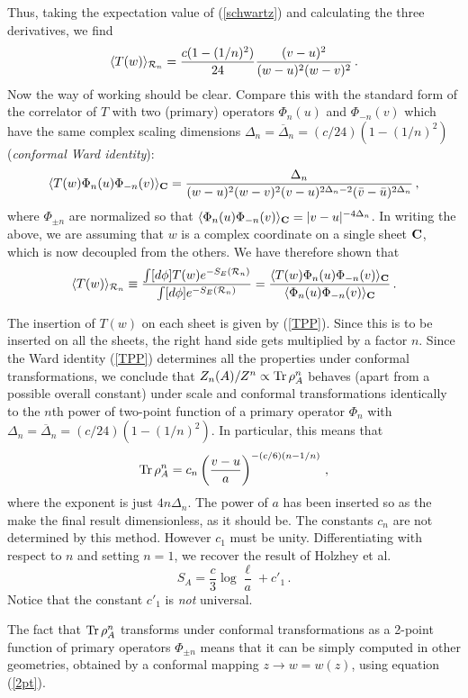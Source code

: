 \documentclass{ws-ijqi}
\def\be{\begin{equation}}
\def\ee{\end{equation}}
\begin{document}
Thus, taking the expectation value of (\ref{schwartz}) and calculating the 
three derivatives, we find
\be
\langle T(w)\rangle_{{\cal R}_n}=
{c(1-(1/n)^2)\over 24}{(v-u)^2\over(w-u)^2(w-v)^2}\,.
\ee
Now the way of working should be clear.
Compare this with the standard form of the correlator of
$T$ with two (primary) operators $\Phi_n(u)$ and $\Phi_{-n}(v)$ which have
the same complex scaling dimensions 
$\Delta_n=\overline\Delta_n=(c/24)(1-(1/n)^2)$ ({\it conformal
Ward identity}):\cite{confbook}
\be
\label{TPP}
\langle T(w)\Phi_n(u)\Phi_{-n}(v)\rangle_{\bf C}=
{\Delta_n\over (w-u)^2(w-v)^2(v-u)^{2\Delta_n-2}
(\bar v-\bar u)^{2\Delta_n}}\,,
\ee
where $\Phi_{\pm n}$ are normalized so that
$\langle \Phi_n(u)\Phi_{-n}(v)\rangle_{\bf C}=|v-u|^{-4\Delta_n}$. 
In writing the above, we are assuming that $w$ is a complex coordinate
on a single sheet $\bf C$, which is now decoupled from the others.   
We have therefore shown that 
\begin{equation}
\langle T(w)\rangle_{{\cal R}_n}\equiv
{\int[d\phi]T(w)e^{-S_E({\cal R}_n)}\over
\int[d\phi]e^{-S_E({\cal R}_n)}}=
{\langle T(w)\Phi_n(u)\Phi_{-n}(v)\rangle_{\bf C}
\over \langle \Phi_n(u)\Phi_{-n}(v)\rangle_{\bf C}}\,.
\end{equation}

The insertion of $T(w)$ on each sheet is given by (\ref{TPP}).
Since this is to be inserted on all the sheets, the right hand side 
gets multiplied by 
a factor $n$.
Since the Ward identity (\ref{TPP}) determines all the properties under 
conformal transformations, we conclude that 
$Z_n({A})/Z^n\propto{\rm Tr}\,\rho_{A}^n$ behaves 
(apart from a possible overall constant)
under scale and conformal transformations identically to the $n$th power
of two-point function of a primary operator $\Phi_n$ with 
$\Delta_n=\overline\Delta_n=(c/24)(1-(1/n)^2)$. 
In particular, this means that
\be
{\rm Tr}\,\rho_{A}^n=c_n\left(\frac{v-u}{a}\right)^{-(c/6)(n-1/n)}\,,
\ee
where the exponent is just $4n\Delta_n$. 
The power of $a$ has been inserted so as the make the final result 
dimensionless, as it should be. 
The constants $c_n$ are not determined by this method. However $c_1$
must be unity. Differentiating with respect to $n$ and setting $n=1$, we
recover the result of Holzhey et al.\cite{Holzhey}
\be
S_A=\frac{c}{3}\log\frac{\ell}{a}+c'_1\,.
\ee
Notice that the constant $c'_1$ is {\it not} universal.


The fact that ${\rm Tr}\,\rho_{A}^n$ transforms under conformal 
transformations as a 2-point function of primary operators $\Phi_{\pm n}$
means that it can be simply computed in other geometries, obtained by a
conformal mapping $z\to w=w(z)$, using equation (\ref{2pt}).
\end{document}
